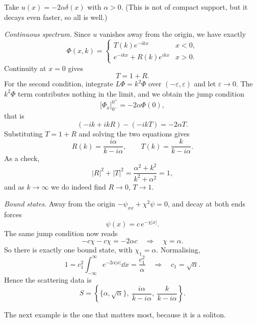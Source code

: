 \begin{example}
	Take $u(x) = -2\alpha\delta(x)$ with $\alpha>0$. (This is not of compact support, but it decays even faster, so all is well.)

	\emph{Continuous spectrum.} Since $u$ vanishes away from the origin, we have exactly
	$$
	\Phi(x,k) = \begin{cases}T(k)e^{-ikx} & x<0,\\ e^{-ikx} + R(k)e^{ikx} & x>0.\end{cases}
	$$
	Continuity at $x=0$ gives
	$$
	T = 1 + R.
	$$
	For the second condition, integrate $L\Phi = k^2\Phi$ over $(-\varepsilon,\varepsilon)$ and let $\varepsilon\to0$. The $k^2\Phi$ term contributes nothing in the limit, and we obtain the jump condition
	$$
	\Big[\Phi_x\Big]_{0^-}^{0^+} = -2\alpha\Phi(0),
	$$
	that is
	$$
	\left(-ik + ikR\right) - \left(-ikT\right) = -2\alpha T.
	$$
	Substituting $T = 1+R$ and solving the two equations gives
	$$
	R(k) = \frac{i\alpha}{k - i\alpha}, \qquad T(k) = \frac{k}{k-i\alpha}.
	$$
	As a check,
	$$
	|R|^2 + |T|^2 = \frac{\alpha^2 + k^2}{k^2+\alpha^2} = 1,
	$$
	and as $k\to\infty$ we do indeed find $R\to0$, $T\to1$.

	\emph{Bound states.} Away from the origin $-\psi_{xx} + \chi^2\psi = 0$, and decay at both ends forces
	$$
	\psi(x) = c\,e^{-\chi|x|}.
	$$
	The same jump condition now reads
	$$
	-c\chi - c\chi = -2\alpha c \quad\Longrightarrow\quad \chi = \alpha.
	$$
	So there is exactly one bound state, with $\chi_1 = \alpha$. Normalising,
	$$
	1 = c_1^2\int_{-\infty}^\infty e^{-2\alpha|x|}\dd x = \frac{c_1^2}{\alpha} \quad\Longrightarrow\quad c_1 = \sqrt\alpha.
	$$
	Hence the scattering data is
	$$
	S = \left\{\{\alpha, \sqrt\alpha\},\ \frac{i\alpha}{k-i\alpha},\ \frac{k}{k-i\alpha}\right\}.
	$$
\end{example}

The next example is the one that matters most, because it is a soliton.

